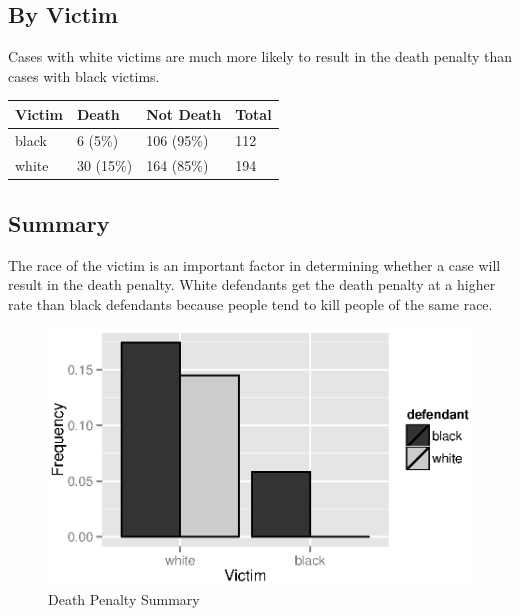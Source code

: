 \documentclass{exam}
\begin{document}
  \subsection{By Victim}

  Cases with white victims are much more likely to result in the death penalty than cases with black victims.
  \begin{table}[H]
    \centering
    \begin{tabular}{llll}
      \toprule
      Victim & Death     & Not Death  & Total \\
      \midrule
      black  & 6 (5\%)   & 106 (95\%) & 112 \\
      white  & 30 (15\%) & 164 (85\%) & 194 \\
      \bottomrule
    \end{tabular}
  \end{table}

  \subsection{Summary}
  The race of the victim is an important factor in determining whether a case will result in the death penalty.  White
  defendants get the death penalty at a higher rate than black defendants because people tend to kill people of the same
  race.

  \begin{figure}[H]
    \centering
    \includegraphics[scale = 0.9]{death_penalty.eps}
    \caption{Death Penalty Summary}
  \end{figure}
\end{document}

